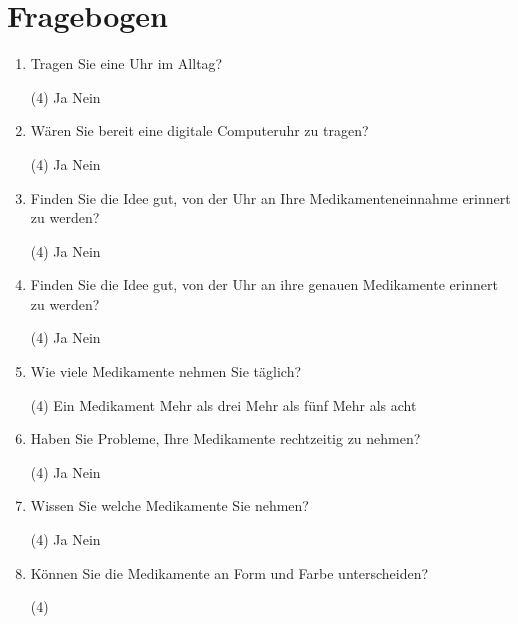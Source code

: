 %


\section{Fragebogen}
\begin{enumerate}
\item Tragen Sie eine Uhr im Alltag?
\begin{tasks}(4)
\task Ja
\task Nein
\end{tasks}
\item Wären Sie bereit eine digitale Computeruhr zu tragen?
\begin{tasks}(4)
\task Ja
\task Nein
\end{tasks}
\item Finden Sie die Idee gut, von der Uhr an Ihre Medikamenteneinnahme erinnert zu werden?
\begin{tasks}(4)
\task Ja
\task Nein
\end{tasks}
\item Finden Sie die Idee gut, von der Uhr an ihre genauen Medikamente erinnert zu werden?
\begin{tasks}(4)
\task Ja
\task Nein
\end{tasks}
\item Wie viele Medikamente nehmen Sie täglich?
\begin{tasks}(4)
\task Ein Medikament
\task Mehr als drei
\task Mehr als fünf
\task Mehr als acht
\end{tasks}
\item Haben Sie Probleme, Ihre Medikamente rechtzeitig zu nehmen?
\begin{tasks}(4)
\task Ja
\task Nein
\end{tasks}
\item Wissen Sie welche Medikamente Sie nehmen?
\begin{tasks}(4)
\task Ja
\task Nein
\end{tasks}
\item Können Sie die Medikamente an Form und Farbe unterscheiden?
\begin{tasks}(4)

\end{tasks}
\end{enumerate}
